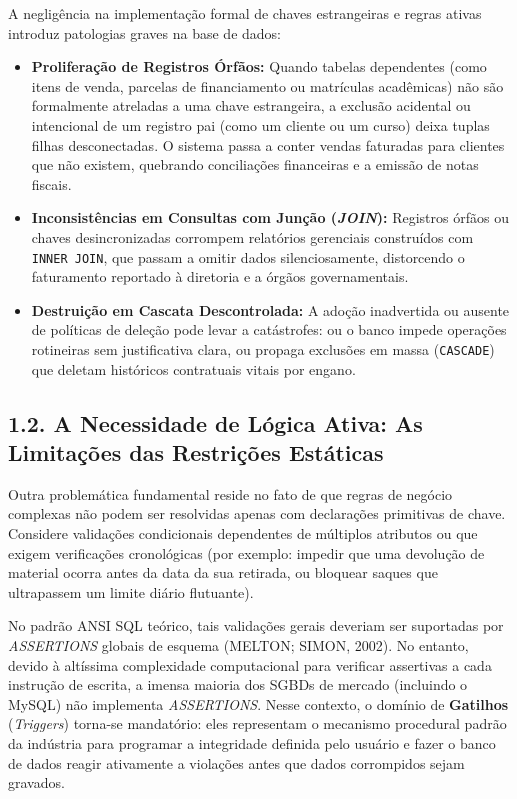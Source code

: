 A negligência na implementação formal de chaves estrangeiras e regras ativas introduz patologias graves na base de dados:
\begin{itemize}
    \item \textbf{Proliferação de Registros Órfãos:} Quando tabelas dependentes (como itens de venda, parcelas de financiamento ou matrículas acadêmicas) não são formalmente atreladas a uma chave estrangeira, a exclusão acidental ou intencional de um registro pai (como um cliente ou um curso) deixa tuplas filhas desconectadas. O sistema passa a conter vendas faturadas para clientes que não existem, quebrando conciliações financeiras e a emissão de notas fiscais.
    \item \textbf{Inconsistências em Consultas com Junção (\textit{JOIN}):} Registros órfãos ou chaves desincronizadas corrompem relatórios gerenciais construídos com \texttt{INNER JOIN}, que passam a omitir dados silenciosamente, distorcendo o faturamento reportado à diretoria e a órgãos governamentais.
    \item \textbf{Destruição em Cascata Descontrolada:} A adoção inadvertida ou ausente de políticas de deleção pode levar a catástrofes: ou o banco impede operações rotineiras sem justificativa clara, ou propaga exclusões em massa (\texttt{CASCADE}) que deletam históricos contratuais vitais por engano.
\end{itemize}

\subsection*{1.2. A Necessidade de Lógica Ativa: As Limitações das Restrições Estáticas}

Outra problemática fundamental reside no fato de que regras de negócio complexas não podem ser resolvidas apenas com declarações primitivas de chave. Considere validações condicionais dependentes de múltiplos atributos ou que exigem verificações cronológicas (por exemplo: impedir que uma devolução de material ocorra antes da data da sua retirada, ou bloquear saques que ultrapassem um limite diário flutuante).

No padrão ANSI SQL teórico, tais validações gerais deveriam ser suportadas por \textit{ASSERTIONS} globais de esquema (MELTON; SIMON, 2002). No entanto, devido à altíssima complexidade computacional para verificar assertivas a cada instrução de escrita, a imensa maioria dos SGBDs de mercado (incluindo o MySQL) não implementa \textit{ASSERTIONS}. Nesse contexto, o domínio de \textbf{Gatilhos} (\textit{Triggers}) torna-se mandatório: eles representam o mecanismo procedural padrão da indústria para programar a integridade definida pelo usuário e fazer o banco de dados reagir ativamente a violações antes que dados corrompidos sejam gravados.

